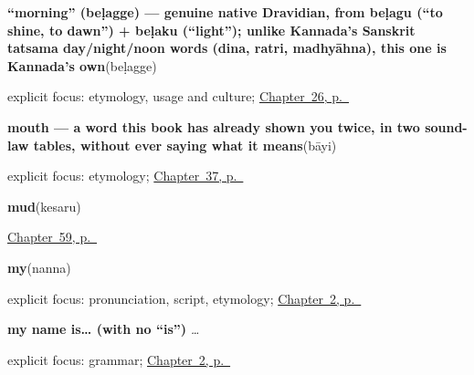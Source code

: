 \noindent\begin{minipage}[t]{\linewidth}
\raggedright
\textbf{\textquotedblleft{}morning\textquotedblright{} (beḷagge) — genuine native Dravidian, from beḷagu (\textquotedblleft{}to shine, to dawn\textquotedblright{}) + beḷaku (\textquotedblleft{}light\textquotedblright{}); unlike Kannada's Sanskrit tatsama day/night/noon words (dina, ratri, madhyāhna), this one is Kannada's own}\enspace\emph{}\enspace(beḷagge)\par
\footnotesize explicit focus: etymology, usage and culture; \hyperref[ch:ka-morning]{Chapter~26, p.~\pageref*{ch:ka-morning}}
\end{minipage}\par\smallskip

\noindent\begin{minipage}[t]{\linewidth}
\raggedright
\textbf{mouth — a word this book has already shown you twice, in two sound-law tables, without ever saying what it means}\enspace\emph{}\enspace(bāyi)\par
\footnotesize explicit focus: etymology; \hyperref[ch:ka-face-words]{Chapter~37, p.~\pageref*{ch:ka-face-words}}
\end{minipage}\par\smallskip

\noindent\begin{minipage}[t]{\linewidth}
\raggedright
\textbf{mud}\enspace\emph{}\enspace(kesaru)\par
\footnotesize \hyperref[ch:ka-weather-ground]{Chapter~59, p.~\pageref*{ch:ka-weather-ground}}
\end{minipage}\par\smallskip

\noindent\begin{minipage}[t]{\linewidth}
\raggedright
\textbf{my}\enspace\emph{}\enspace(nanna)\par
\footnotesize explicit focus: pronunciation, script, etymology; \hyperref[ch:introductions]{Chapter~2, p.~\pageref*{ch:introductions}}
\end{minipage}\par\smallskip

\noindent\begin{minipage}[t]{\linewidth}
\raggedright
\textbf{my name is… (with no \textquotedblleft{}is\textquotedblright{})}\enspace\emph{  …}\par
\footnotesize explicit focus: grammar; \hyperref[ch:introductions]{Chapter~2, p.~\pageref*{ch:introductions}}
\end{minipage}\par\smallskip

